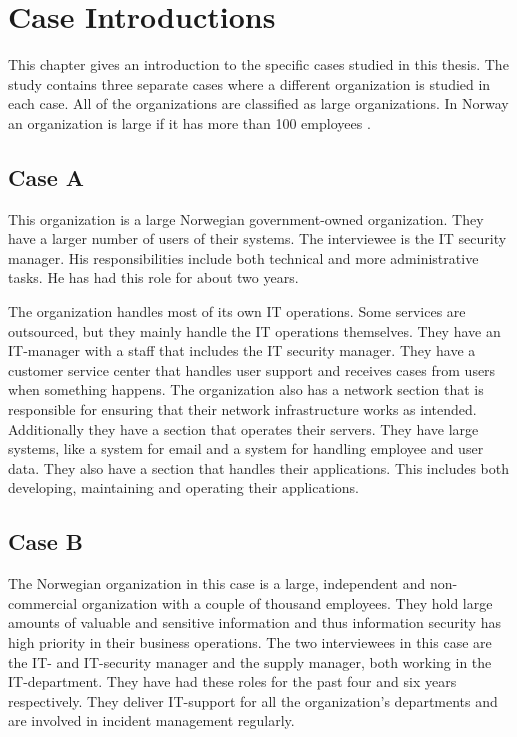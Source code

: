 \chapter{Case Introductions}
\label{chp:CaseIntroductions}
This chapter gives an introduction to the specific cases studied in this thesis. The study contains three separate cases where a different organization is studied in each case. All of the organizations are classified as large organizations. In Norway an organization is large if it has more than 100 employees \cite{SMB}.

\section{Case A}
This organization is a large Norwegian government-owned organization. They have a larger number of users of their systems. The interviewee is the IT security manager. His responsibilities include both technical and more administrative tasks. He has had this role for about two years.

The organization handles most of its own IT operations. Some services are outsourced, but they mainly handle the IT operations themselves. They have an IT-manager with a staff that includes the IT security manager. They have a customer service center %
that handles user support and receives cases from users when something happens. The organization also has a network section that is responsible for ensuring that their network infrastructure works as intended. Additionally they have  a section that operates their servers. They have large systems, like a system for email and a system for handling employee and user data. They also have a section that handles their applications. This includes both developing, maintaining and operating their applications.

\section{Case B}
The Norwegian organization in this case is a large, independent and non-commercial organization with a couple of thousand employees. They hold large amounts of valuable and sensitive information and thus information security has high priority in their business operations. The two interviewees in this case are the IT- and IT-security manager and the supply manager, both working in the IT-department. They have had these roles for the past four and six years respectively. They deliver IT-support for all the organization's departments and are involved in incident management regularly.   

